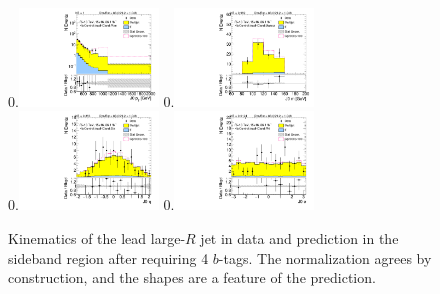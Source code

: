 \begin{figure}[htbp!]
\begin{center}
0.\includegraphics[width=0.33\textwidth, angle=270]{./figures/boosted/Control/Moriond_FourTag_Control_leadHCand_Pt_m_1.pdf}
0.\includegraphics[width=0.33\textwidth, angle=270]{./figures/boosted/Control/Moriond_FourTag_Control_leadHCand_Mass_s.pdf}\\
0.\includegraphics[width=0.33\textwidth, angle=270]{./figures/boosted/Control/Moriond_FourTag_Control_leadHCand_Eta.pdf}
0.\includegraphics[width=0.33\textwidth, angle=270]{./figures/boosted/Control/Moriond_FourTag_Control_leadHCand_Phi.pdf}
  \caption{Kinematics of the lead large-$R$ jet in data and prediction in the sideband region after requiring 4 $b$-tags. The normalization agrees by construction, and the shapes are a feature of the prediction.}
  \label{fig:boosted-4b-control-ak10-lead}
\end{center}
\end{figure}

